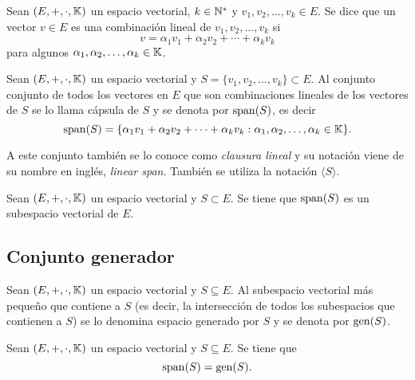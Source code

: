 \documentclass[a4,11pt]{aleph-notas}
\begin{document}
\begin{defi}
    Sean $(E,+,\cdot,\mathbb{K})$ un espacio vectorial, $k\in\mathbb{N}^*$ y $v_1, v_2, \ldots, v_k \in E$. Se dice que un vector $v \in E$ es una combinación lineal de 
    $v_1, v_2, \ldots, v_k$ si 
    \[
        v = \alpha_1 v_1 + \alpha_2 v_2 + \cdots + \alpha_k v_k
    \]
    para algunos $\alpha_1, \alpha_2, \ldots, \alpha_k \in \mathbb{K}$.
\end{defi}

\begin{defi}
    Sean $(E,+,\cdot,\mathbb{K})$ un espacio vectorial y $S = \{v_1, v_2, \ldots, v_k\} \subset E$. Al conjunto conjunto de todos los vectores en $E$ que son combinaciones lineales de los vectores de $S$ se lo llama cápsula de $S$ y se denota por $\operatorname{span}(S)$, es decir
    \[
        \operatorname{span}(S) = \{\alpha_1 v_1 + \alpha_2 v_2 + \cdots + \alpha_k v_k:\alpha_1, \alpha_2, \ldots, \alpha_k \in \mathbb{K}\}.
    \]
\end{defi}

\begin{advertencia}
    A este conjunto también se lo conoce como \emph{clausura lineal} y su notación viene de su nombre en inglés, \emph{linear span}. También se utiliza la notación $\langle S\rangle$.
\end{advertencia}

\begin{teo}
   Sean $(E,+,\cdot,\mathbb{K})$ un espacio vectorial y $S\subset E$. Se tiene que $\operatorname{span}(S)$ es un subespacio vectorial de $E$.
\end{teo}

\subsection{Conjunto generador}

\begin{defi}
    Sean $(E,+,\cdot,\mathbb{K})$ un espacio vectorial y $S\subseteq E$. Al subespacio vectorial más pequeño que contiene a $S$ (es decir, la intersección de todos los subespacios que contienen a $S$) se lo denomina espacio generado por $S$ y se denota por $\operatorname{gen}(S)$.
\end{defi}

\begin{teo}
    Sean $(E,+,\cdot,\mathbb{K})$ un espacio vectorial y $S\subseteq E$. Se tiene que
    \[
        \operatorname{span}(S)=\operatorname{gen}(S).
    \]
\end{teo}
\end{document}
